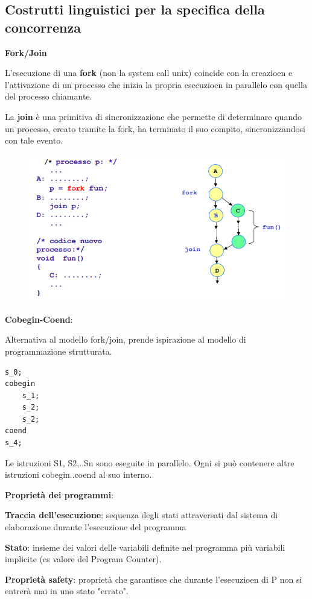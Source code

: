 \documentclass{article}
\begin{document}
\subsection{Costrutti linguistici per la specifica della concorrenza}

\textbf{Fork/Join}

L'esecuzione di una \textbf{fork} (non la system call unix) coincide con la creazioen e l'attivazione di un processo che inizia la propria esecuzioen in parallelo
con quella del processo chiamante.

La \textbf{join} è una primitiva di sincronizzazione che permette di determinare quando un processo, creato tramite la fork, ha terminato il suo compito,
sincronizzandosi con tale evento.

\begin{figure}[htbp]
    \centering
    \includegraphics[width=0.50\columnwidth]{imgs/fork.PNG}
\end{figure}

\vspace{5mm}
\textbf{Cobegin-Coend}:

Alternativa al modello fork/join, prende ispirazione al modello di programmazione strutturata.

\begin{lstlisting}
s_0;
cobegin
    s_1;
    s_2;
    s_2;
coend
s_4;
\end{lstlisting}

Le istruzioni S1, S2,..Sn sono eseguite in parallelo. Ogni si può contenere altre istruzioni cobegin..coend al suo interno.

\vspace{5mm}
\textbf{Proprietà dei programmi}:

\textbf{Traccia dell'esecuzione}: sequenza degli stati attraversati dal sistema di elaborazione durante l'esecuzione del programma

\textbf{Stato}: insieme dei valori delle variabili definite nel programma più variabili implicite (es valore del Program Counter).

\textbf{Proprietà safety}: proprietà che garantisce che durante l'esecuzioen di P non si entrerà mai in uno stato "errato".
\end{document}
